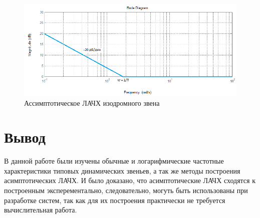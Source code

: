 \documentclass[a4paper, 11pt, russian]{article}
\begin{document}
    \begin{figure}[ht!]
        \centering
        \includegraphics[scale = 0.58]{isodromusLinkAsymp}
        \caption{Ассимптотическое ЛАЧХ изодромного звена}
    \end{figure}
    \clearpage
    \section{Вывод}
    В данной работе были изучены обычные и логарифмические частотные характеристики типовых динамических звеньев, а так же методы построения асимптотических ЛАЧХ. И было доказано, что асимптотические ЛАЧХ сходятся к построенным эксперементально, следовательно, могуть быть использованы при разработке систем, так как для их построения практически не требуется вычислительная работа.
\end{document}
